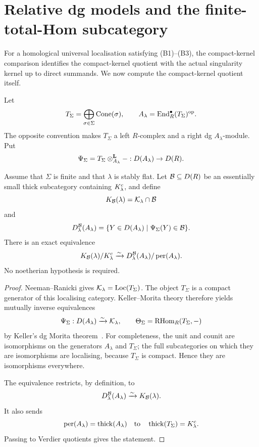 
\section{Relative dg models and the finite-total-Hom subcategory}\label{sec:dg-models}

For a homological universal localisation satisfying \textup{(B1)--(B3)}, the compact-kernel comparison identifies the compact-kernel quotient with the actual singularity kernel up to direct summands.  We now compute the compact-kernel quotient itself.

Let
\[
 T_\Sigma=\bigoplus_{\sigma\in\Sigma}\operatorname{Cone}(\sigma),
 \qquad
 A_\lambda=\operatorname{End}_R^\bullet(T_\Sigma)^{\mathrm{op}}.
\]
The opposite convention makes \(T_\Sigma\) a left \(R\)-complex and a right dg \(A_\lambda\)-module.  Put
\[
 \Psi_\Sigma=T_\Sigma\otimes^{\mathbf L}_{A_\lambda}-:D(A_\lambda)\to D(R).
\]

\begin{theorem}\label{thm:relative-dg-formula}
Assume that \(\Sigma\) is finite and that \(\lambda\) is stably flat.  Let \(\mathcal B\subseteq D(R)\) be an essentially small thick subcategory containing \(K^c_\lambda\), and define
\[
 K_{\mathcal B}(\lambda)=\mathcal K_\lambda\cap\mathcal B
\]
and
\[
 D^{\mathcal B}_\lambda(A_\lambda)
 =\{Y\in D(A_\lambda)\mid\Psi_\Sigma(Y)\in\mathcal B\}.
\]
There is an exact equivalence
\[
 K_{\mathcal B}(\lambda)/K^c_\lambda
 \xrightarrow{\sim}
 D^{\mathcal B}_\lambda(A_\lambda)/\operatorname{per}(A_\lambda).
\]
No noetherian hypothesis is required.
\end{theorem}

\begin{proof}
Neeman--Ranicki gives
\(\mathcal K_\lambda=\operatorname{Loc}(T_\Sigma)\).  The object \(T_\Sigma\) is a compact generator of this localising category.  Keller--Morita theory therefore yields mutually inverse equivalences
\[
 \Psi_\Sigma:D(A_\lambda)\xrightarrow{\sim}\mathcal K_\lambda,
 \qquad
 \Theta_\Sigma=\operatorname{RHom}_R(T_\Sigma,-)
\]
by Keller's dg Morita theorem~\cite[Theorem~8.2]{Keller94}.
For completeness, the unit and counit are isomorphisms on the generators
\(A_\lambda\) and \(T_\Sigma\); the full subcategories on which they are isomorphisms are localising, because \(T_\Sigma\) is compact.  Hence they are isomorphisms everywhere.

The equivalence restricts, by definition, to
\[
 D^{\mathcal B}_\lambda(A_\lambda)\xrightarrow{\sim}K_{\mathcal B}(\lambda).
\]
It also sends
\[
 \operatorname{per}(A_\lambda)=\operatorname{thick}(A_\lambda)
 \quad\text{to}\quad
 \operatorname{thick}(T_\Sigma)=K^c_\lambda.
\]
Passing to Verdier quotients gives the statement.
\end{proof}

